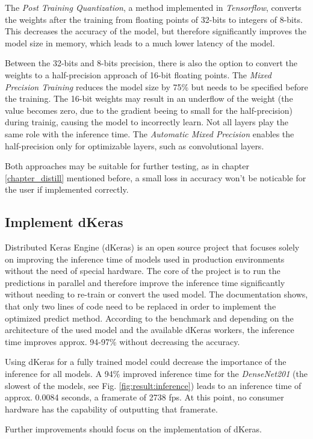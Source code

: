 The \textit{Post Training Quantization}\cite{postprec}, a method implemented in \textit{Tensorflow}, converts the weights after the training from floating points of 32-bits to integers of 8-bits. This decreases the accuracy of the model, but therefore significantly improves the model size in memory, which leads to a much lower latency of the model.

Between the 32-bits and 8-bits precision, there is also the option to convert the weights to a half-precision approach of 16-bit floating points. The \textit{Mixed Precision Training} reduces the model size by 75\% but needs to be specified before the training. The 16-bit weights may result in an underflow of the weight (the value becomes zero, due to the gradient beeing to small for the half-precision) during trainig, causing the model to incorrectly learn. Not all layers play the same role with the inference time. The \textit{Automatic Mixed Precision} enables the half-precision only for optimizable layers, such as convolutional layers.\cite{micikevicius2018mixed}

Both approaches may be suitable for further testing, as in chapter \ref{chapter_distill} mentioned before, a small loss in accuracy won't be noticable for the user if implemented correctly.

\subsection{Implement dKeras}
Distributed Keras Engine (dKeras)\cite{dkeras} is an open source project that focuses solely on improving the inference time of models used in production environments without the need of special hardware. The core of the project is to run the predictions in parallel and therefore improve the inference time significantly without needing to re-train or convert the used model. The documentation shows, that only two lines of code need to be replaced in order to implement the optimized predict method. According to the benchmark and depending on the architecture of the used model and the available dKeras workers, the inference time improves approx. 94-97\% without decreasing the accuracy. 

Using dKeras for a fully trained model could decrease the importance of the inference for all models. A 94\% improved inference time for the \textit{DenseNet201} (the slowest of the models, see Fig. \ref{fig:result:inference}) leads to an inference time of approx. 0.0084 seconds, a framerate of 2738 fps. At this point, no consumer hardware has the capability of outputting that framerate.

Further improvements should focus on the implementation of dKeras.